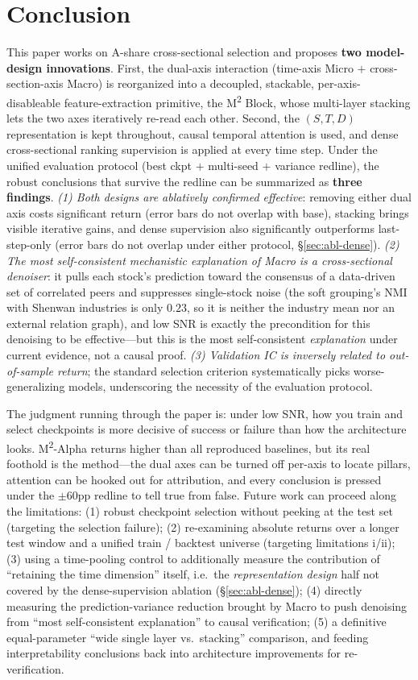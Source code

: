 \documentclass[a4paper,11pt]{article}
\newcommand{\msq}{\texorpdfstring{M\textsuperscript{2}}{M2}}             %
\newcommand{\msqa}{\texorpdfstring{M\textsuperscript{2}-Alpha}{M2-Alpha}} %
\begin{document}
\section{Conclusion}\label{sec:conclusion}
This paper works on A-share cross-sectional selection and proposes
\textbf{two model-design innovations}. First, the dual-axis interaction
(time-axis Micro $+$ cross-section-axis Macro) is reorganized into a decoupled,
stackable, per-axis-disableable feature-extraction primitive, the \msq{} Block,
whose multi-layer stacking lets the two axes iteratively re-read each other.
Second, the $(S,T,D)$ representation is kept throughout, causal temporal
attention is used, and dense cross-sectional ranking supervision is applied at
every time step. Under the unified evaluation protocol (best ckpt $+$ multi-seed
$+$ variance redline), the robust conclusions that survive the redline can be
summarized as \textbf{three findings}. \emph{(1) Both designs are ablatively
confirmed effective}: removing either dual axis costs significant return (error
bars do not overlap with base), stacking brings visible iterative gains, and
dense supervision also significantly outperforms last-step-only (error bars do
not overlap under either protocol, \S\ref{sec:abl-dense}). \emph{(2) The most
self-consistent mechanistic explanation of Macro is a cross-sectional
denoiser}: it pulls each stock's prediction toward the consensus of a
data-driven set of correlated peers and suppresses single-stock noise (the soft
grouping's NMI with Shenwan industries is only $0.23$, so it is neither the
industry mean nor an external relation graph), and low SNR is exactly the
precondition for this denoising to be effective---but this is the most
self-consistent \emph{explanation} under current evidence, not a causal proof.
\emph{(3) Validation IC is inversely related to out-of-sample return}; the
standard selection criterion systematically picks worse-generalizing models,
underscoring the necessity of the evaluation protocol.

The judgment running through the paper is: under low SNR, how you train and
select checkpoints is more decisive of success or failure than how the
architecture looks. \msqa{} returns higher than all reproduced baselines, but
its real foothold is the method---the dual axes can be turned off per-axis to
locate pillars, attention can be hooked out for attribution, and every
conclusion is pressed under the $\pm60$pp redline to tell true from false.
Future work can proceed along the limitations: (1) robust checkpoint selection
without peeking at the test set (targeting the selection failure); (2)
re-examining absolute returns over a longer test window and a unified
train / backtest universe (targeting limitations i/ii); (3) using a
time-pooling control to additionally measure the contribution of ``retaining
the time dimension'' itself, i.e.\ the \emph{representation design} half not
covered by the dense-supervision ablation (\S\ref{sec:abl-dense}); (4) directly
measuring the prediction-variance reduction brought by Macro to push denoising
from ``most self-consistent explanation'' to causal verification; (5) a
definitive equal-parameter ``wide single layer vs.\ stacking'' comparison, and
feeding interpretability conclusions back into architecture improvements for
re-verification.
\end{document}

